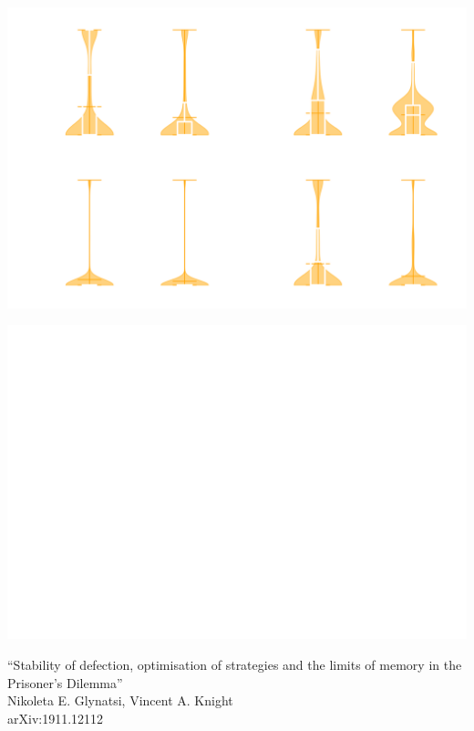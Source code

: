 \documentclass{beamer}
\begin{document}
\begin{frame}
    \begin{center}
    \includegraphics[width=.8\textwidth]{static/mem_one_violin.png}
    \end{center}
\end{frame}

\begin{frame}
    \begin{center}
    
    \end{center}
\end{frame}

\begin{frame}
    \begin{center}
    \includegraphics[width=.8\textwidth]{static/mem_one_against_longer_memory.png}
    \end{center}
\end{frame}

\begin{frame}
    \begin{center}
        \large{``Stability of defection, optimisation of strategies and the limits of memory in the Prisoner's Dilemma''} \\ \vspace{.5cm}
        \footnotesize{Nikoleta E. Glynatsi, Vincent A. Knight} \\ \vspace{.5cm}
        \footnotesize{arXiv:1911.12112}
    \end{center}
\end{frame}
\end{document}
